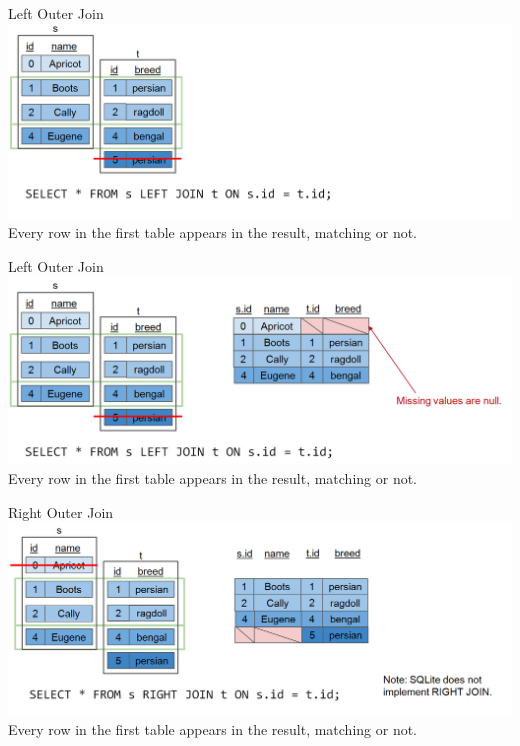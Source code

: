 \documentclass[aspectratio=169]{../latex_main/tntbeamer}  %
\begin{document}
	
	\begin{frame}{Left Outer Join}
	    \includegraphics[scale=.41]{Bild15}\\
	    Every row in the first table appears in the result, matching or not.
	\end{frame}
	
	
	
	\begin{frame}{Left Outer Join}
	    \includegraphics[scale=.41]{Bild16}\\
	    Every row in the first table appears in the result, matching or not.
	\end{frame}
	
	
	\begin{frame}{Right Outer Join}
	    \includegraphics[scale=.41]{Bild17}\\
	    Every row in the first table appears in the result, matching or not.
	\end{frame}
	
\end{document}
